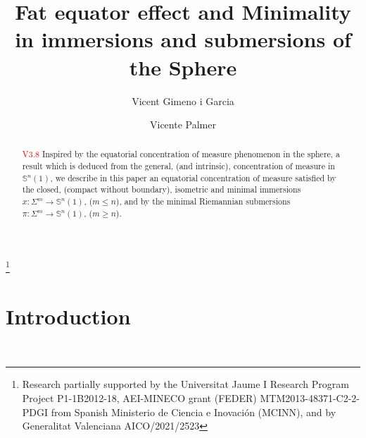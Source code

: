 \documentclass{amsart}
\theoremstyle{definition}
\theoremstyle{remark}
\newcommand{\ese}{\mathbb{S}}
\begin{document}
\title[Fat equator effect and minimality]{Fat equator effect and Minimality in immersions and submersions of the Sphere}





\author{Vicent Gimeno i Garcia}
\address{Department of Mathematics, Universitat Jaume I-IMAC,   E-12071, 
Castell\'{o}, Spain}
\author{Vicente Palmer}
\address{Department of Mathematics, Universitat Jaume I-INIT,   E-12071, 
Castell\'{o}, Spain}

\thanks{Research partially supported by  the Universitat Jaume I Research Program Project P1-1B2012-18, AEI-MINECO grant (FEDER) MTM2013-48371-C2-2-PDGI from Spanish Ministerio de Ciencia e Inovaci\'{o}n (MCINN), and by Generalitat Valenciana AICO/2021/2523}





\dedicatory{}



\begin{abstract}\textcolor{red}{V3.8}
Inspired by the equatorial concentration of measure phenomenon in the sphere, a result which is deduced from the general, (and intrinsic), concentration of measure in $\ese^n(1)$, we describe in this paper an equatorial concentration of measure satisfied by the closed, (compact without boundary), isometric and minimal immersions $x:\Sigma^m \rightarrow \ese^n(1)$, ($m \leq n$), and by the minimal Riemannian submersions $\pi: \Sigma^m \rightarrow \ese^n(1)$, ($m \geq n$).\end{abstract}

\maketitle

\section{Introduction}\label{sec:intro}\
\end{document}
